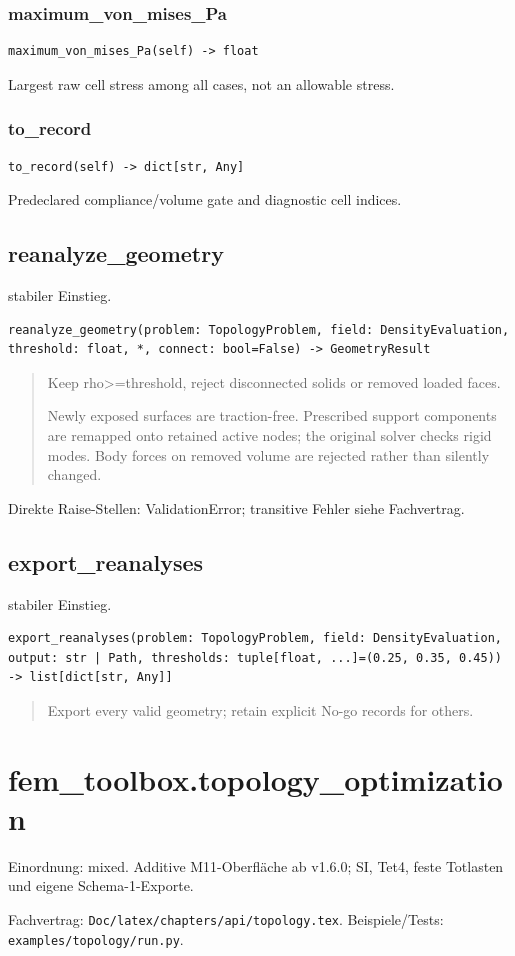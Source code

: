 \subsubsection*{maximum\_von\_mises\_Pa}
\begin{lstlisting}
maximum_von_mises_Pa(self) -> float
\end{lstlisting}
Largest raw cell stress among all cases, not an allowable stress.
\subsubsection*{to\_record}
\begin{lstlisting}
to_record(self) -> dict[str, Any]
\end{lstlisting}
Predeclared compliance/volume gate and diagnostic cell indices.
\subsection{reanalyze\_geometry}
stabiler Einstieg.
\begin{lstlisting}
reanalyze_geometry(problem: TopologyProblem, field: DensityEvaluation, threshold: float, *, connect: bool=False) -> GeometryResult
\end{lstlisting}
\begin{quote}
Keep rho>=threshold, reject disconnected solids or removed loaded faces.\par Newly exposed surfaces are traction-free. Prescribed support components are remapped onto retained active nodes; the original solver checks rigid modes. Body forces on removed volume are rejected rather than silently changed.
\end{quote}
Direkte Raise-Stellen: ValidationError; transitive Fehler siehe Fachvertrag.
\subsection{export\_reanalyses}
stabiler Einstieg.
\begin{lstlisting}
export_reanalyses(problem: TopologyProblem, field: DensityEvaluation, output: str | Path, thresholds: tuple[float, ...]=(0.25, 0.35, 0.45)) -> list[dict[str, Any]]
\end{lstlisting}
\begin{quote}
Export every valid geometry; retain explicit No-go records for others.
\end{quote}
\section{fem\_toolbox.topology\_optimization}
Einordnung: mixed. Additive M11-Oberfläche ab v1.6.0; SI, Tet4, feste Totlasten und eigene Schema-1-Exporte.
\par Fachvertrag: \nolinkurl{Doc/latex/chapters/api/topology.tex}. Beispiele/Tests:
\nolinkurl{examples/topology/run.py}.
